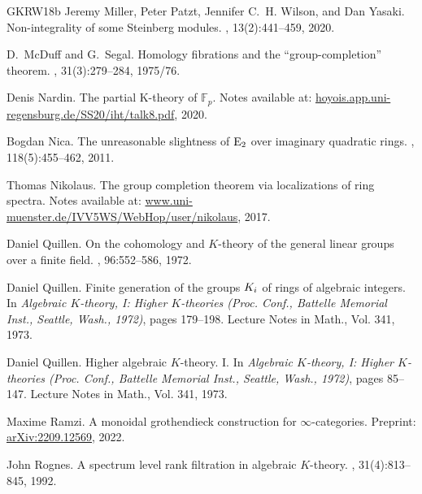 \documentclass[12pt, reqno]{amsart}
\theoremstyle{plain}
\theoremstyle{definition}
\begin{document}
\begin{thebibliography}{GKRW18b}
Jeremy Miller, Peter Patzt, Jennifer C.~H. Wilson, and Dan Yasaki.
\newblock Non-integrality of some {S}teinberg modules.
, 13(2):441--459, 2020.

D.~McDuff and G.~Segal.
\newblock Homology fibrations and the ``group-completion'' theorem.
, 31(3):279--284, 1975/76.

Denis Nardin.
\newblock The partial {K}-theory of {$\mathbb{F}_p$}.
\newblock Notes available at:
  \href{https://hoyois.app.uni-regensburg.de/SS20/iht/talk8.pdf}{hoyois.app.uni-regensburg.de/SS20/iht/talk8.pdf},
  2020.

Bogdan Nica.
\newblock The unreasonable slightness of {${\rm E}_2$} over imaginary quadratic
  rings.
, 118(5):455--462, 2011.

Thomas Nikolaus.
\newblock The group completion theorem via localizations of ring spectra.
\newblock Notes available at:
  \href{https://www.uni-muenster.de/IVV5WS/WebHop/user/nikolaus/Papers/Group_completion.pdf}{www.uni-muenster.de/IVV5WS/WebHop/user/nikolaus},
  2017.

Daniel Quillen.
\newblock On the cohomology and {$K$}-theory of the general linear groups over
  a finite field.
, 96:552--586, 1972.

Daniel Quillen.
\newblock Finite generation of the groups {$K\sb{i}$} of rings of algebraic
  integers.
\newblock In {\em Algebraic {$K$}-theory, {I}: {H}igher {$K$}-theories ({P}roc.
  {C}onf., {B}attelle {M}emorial {I}nst., {S}eattle, {W}ash., 1972)}, pages
  179--198. Lecture Notes in Math., Vol. 341, 1973.

Daniel Quillen.
\newblock Higher algebraic {$K$}-theory. {I}.
\newblock In {\em Algebraic {$K$}-theory, {I}: {H}igher {$K$}-theories ({P}roc.
  {C}onf., {B}attelle {M}emorial {I}nst., {S}eattle, {W}ash., 1972)}, pages
  85--147. Lecture Notes in Math., Vol. 341, 1973.

Maxime Ramzi.
\newblock A monoidal grothendieck construction for {$\infty$}-categories.
\newblock Preprint:
  \href{https://arxiv.org/abs/math/2209.12569}{arXiv:2209.12569}, 2022.

John Rognes.
\newblock A spectrum level rank filtration in algebraic {$K$}-theory.
, 31(4):813--845, 1992.


\end{thebibliography}
\end{document}
